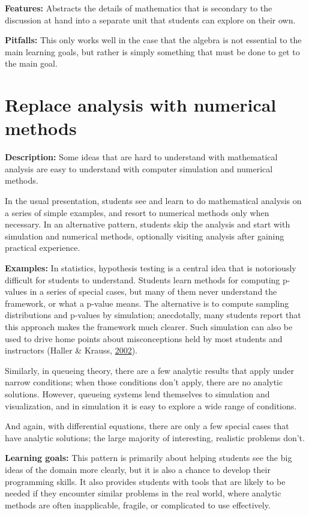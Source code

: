 \documentclass[]{book}
\begin{document}
\textbf{Features:}
Abstracts the details of mathematics that is secondary to the discussion at hand
into a separate unit that students can explore on their own.

\textbf{Pitfalls:}
This only works well in the case that the algebra is not essential to the main
learning goals, but rather is simply something that must be done to get to the main goal.

\hypertarget{replace-analysis-with-numerical-methods}{%
\section{Replace analysis with numerical methods}\label{replace-analysis-with-numerical-methods}}

\textbf{Description:}
Some ideas that are hard to understand with mathematical analysis are easy to
understand with computer simulation and numerical methods.

In the usual presentation, students see and learn to do mathematical analysis
on a series of simple examples, and resort to numerical methods only when
necessary. In an alternative pattern, students skip the analysis and start with
simulation and numerical methods, optionally visiting analysis after gaining
practical experience.

\textbf{Examples:}
In statistics, hypothesis testing is a central idea that is notoriously
difficult for students to understand. Students learn methods for computing
p-values in a series of special cases, but many of them never understand the
framework, or what a p-value means. The alternative is to compute sampling
distributions and p-values by simulation; anecdotally, many students report
that this approach makes the framework much clearer. Such simulation can also
be used to drive home points about misconceptions held by most students and
instructors (Haller \& Krauss, \protect\hyperlink{ref-HallerKrauss2002}{2002}).

Similarly, in queueing theory, there are a few analytic results that apply
under narrow conditions; when those conditions don't apply, there are no
analytic solutions. However, queueing systems lend themselves to simulation and
visualization, and in simulation it is easy to explore a wide range of
conditions.

And again, with differential equations, there are only a few special cases that
have analytic solutions; the large majority of interesting, realistic problems
don't.

\textbf{Learning goals:}
This pattern is primarily about helping students see the big ideas of the
domain more clearly, but it is also a chance to develop their programming
skills. It also provides students with tools that are likely to be needed if
they encounter similar problems in the real world, where analytic methods are
often inapplicable, fragile, or complicated to use effectively.
\end{document}
